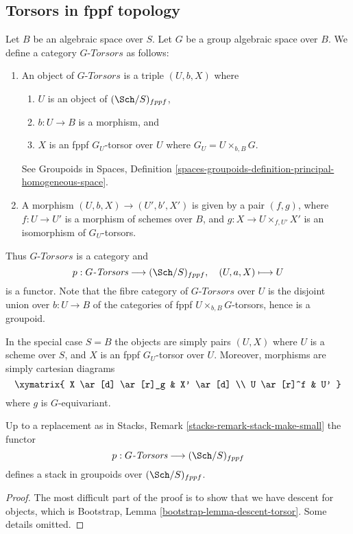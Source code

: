 \subsection{Torsors in fppf topology}
\label{subsection-fppf-torsors}

\noindent
Let $B$ be an algebraic space over $S$.
Let $G$ be a group algebraic space over $B$.
We define a category $G\textit{-Torsors}$ as follows:
\begin{enumerate}
\item An object of $G\textit{-Torsors}$ is a triple $(U, b, X)$ where
\begin{enumerate}
\item $U$ is an object of $(\Sch/S)_{fppf}$,
\item $b : U \to B$ is a morphism, and
\item $X$ is an fppf $G_U$-torsor over $U$ where $G_U = U \times_{b, B} G$.
\end{enumerate}
See
Groupoids in Spaces,
Definition \ref{spaces-groupoids-definition-principal-homogeneous-space}.
\item A morphism $(U, b, X) \to (U', b', X')$ is given
by a pair $(f, g)$, where $f : U \to U'$ is a morphism of schemes
over $B$, and $g : X \to U \times_{f, U'} X'$ is an
isomorphism of $G_U$-torsors.
\end{enumerate}
Thus $G\textit{-Torsors}$ is a category and
$$
p : G\textit{-Torsors} \longrightarrow (\Sch/S)_{fppf},
\quad
(U, a, X) \longmapsto U
$$
is a functor. Note that the fibre category of $G\textit{-Torsors}$
over $U$ is the disjoint union over $b : U \to B$
of the categories of fppf $U \times_{b, B} G$-torsors,
hence is a groupoid.

\medskip\noindent
In the special case $S = B$ the objects are simply pairs
$(U, X)$ where $U$ is a scheme over $S$, and $X$ is an fppf
$G_U$-torsor over $U$. Moreover, morphisms are simply cartesian
diagrams
$$
\xymatrix{
X \ar[d] \ar[r]_g & X' \ar[d] \\
U \ar[r]^f & U'
}
$$
where $g$ is $G$-equivariant.

\begin{lemma}
\label{lemma-torsors-stack-in-groupoids}
Up to a replacement as in
Stacks, Remark \ref{stacks-remark-stack-make-small}
the functor
$$
p : G\textit{-Torsors} \longrightarrow (\Sch/S)_{fppf}
$$
defines a stack in groupoids over $(\Sch/S)_{fppf}$.
\end{lemma}

\begin{proof}
The most difficult part of the proof is to show that we have descent for
objects, which is
Bootstrap, Lemma \ref{bootstrap-lemma-descent-torsor}.
Some details omitted.
\end{proof}

